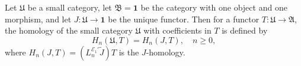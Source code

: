 Let $\mathfrak{U}$ be a small category, let $\mathfrak{B} = \mathbf{1}$ be the category with one object and one morphism, and let $J: \mathfrak{U} \rightarrow \mathbf{1}$ be the unique functor. Then for a functor $T: \mathfrak{U} \rightarrow \mathfrak{A}$, the homology of the small category $\mathfrak{U}$ with coefficients in $T$ is defined by
$$H_n(\mathfrak{U}, T) = H_n(J, T), \quad n \geq 0,$$
where $H_n(J, T) = (L_n^{\mathcal{E}_1'} \tilde{J}) T$ is the $J$-homology.
